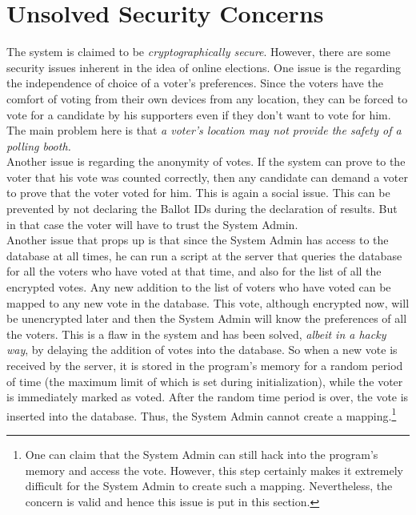 \documentclass[twoside,twocolumn]{article}
\newcommand\tab[1][1cm]{\hspace*{#1}}
\begin{document}
\section{Unsolved Security Concerns}
    \tab The system is claimed to be \textit{cryptographically secure}. However, there are some security issues inherent in the idea of online elections.
    \tab One issue is the regarding the independence of choice of a voter's preferences. Since the voters have the comfort of voting from their own devices from any location, they can be forced to vote for a candidate by his supporters even if they don't want to vote for him. The main problem here is that \textit{a voter's location may not provide the safety of a polling booth.}\\
    \tab Another issue is regarding the anonymity of votes. If the system can prove to the voter that his vote was counted correctly, then any candidate can demand a voter to prove that the voter voted for him. This is again a social issue. This can be prevented by not declaring the Ballot IDs during the declaration of results. But in that case the voter will have to trust the System Admin.\\
    \tab Another issue that props up is that since the System Admin has access to the database at all times, he can run a script at the server that queries the database for all the voters who have voted at that time, and also for the list of all the encrypted votes. Any new addition to the list of voters who have voted can be mapped to any new vote in the database. This vote, although encrypted now, will be unencrypted later and then the System Admin will know the preferences of all the voters. This is a flaw in the system and has been solved, \textit{albeit in a hacky way}, by delaying the addition of votes into the database. So when a new vote is received by the server, it is stored in the program's memory for a random period of time (the maximum limit of which is set during initialization), while the voter is immediately marked as voted. After the random time period is over, the vote is inserted into the database. Thus, the System Admin cannot create a mapping.\footnote[2]{One can claim that the System Admin can still hack into the program's memory and access the vote. However, this step certainly makes it extremely difficult for the System Admin to create such a mapping. Nevertheless, the concern is valid and hence this issue is put in this section.}
\end{document}
